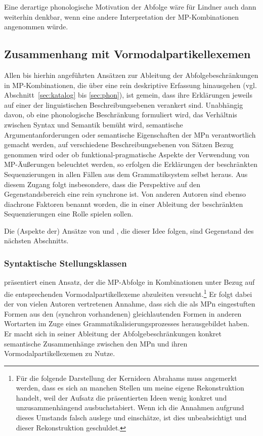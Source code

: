 Eine derartige phonologische Motivation der Abfolge wäre für Lindner auch dann weiterhin denkbar, wenn eine andere Interpretation der MP-Kombinationen angenommen würde. 	

\subsection{Zusammenhang mit Vormodalpartikellexemen}
\label{sec:vormp}
Allen bis hierhin angeführten Ansätzen zur Ableitung der Abfolgebeschränkungen in MP-Kombinationen, die über eine rein deskriptive Erfassung hinausgehen (vgl. Abschnitt~\ref{sec:katalog} bis \ref{sec:phon}), ist gemein, dass ihre Erklärungen jeweils auf einer der linguistischen Beschreibungsebenen verankert sind. Unabhängig davon, ob eine phonologische Beschränkung formuliert wird, das Verhältnis zwischen Syntax und Semantik bemüht wird, semantische Argumentanforderungen oder semantische Eigenschaften der MPn verantwortlich gemacht werden, auf verschie\-dene Beschreibungsebenen von Sätzen Bezug genommen wird oder ob funktional-pragmatische Aspekte der Verwendung von MP-Äußerungen beleuchtet werden, so erfolgen die Erklärungen der beschränkten Sequenzierungen in allen Fällen aus dem Grammatiksystem selbst heraus. Aus diesem Zugang folgt insbesondere, dass die Perspektive auf den Gegenstandsbereich eine rein synchrone  ist. Von anderen Autoren sind ebenso diachrone  Faktoren benannt worden, die in einer Ableitung der beschränkten Sequenzierungen eine Rolle spielen sollen.

Die (Aspekte der) Ansätze von \citet{Vismans1994} und \citet{Abraham1995}, die dieser Idee folgen, sind Gegenstand des nächsten Abschnitts.

\subsubsection{Syntaktische Stellungsklassen}
\citet{Abraham1995} präsentiert einen Ansatz, der die MP-Abfolge in Kombinatio\-nen unter Bezug auf die entsprechenden Vormodalpartikellexeme  abzuleiten versucht.\footnote{Für die folgende Darstellung der Kernideen Abrahams muss angemerkt werden, dass es sich an manchen Stellen um meine eigene Rekonstruktion handelt, weil der Aufsatz die präsentierten Ideen wenig konkret und unzusammenhängend ausbuchstabiert. Wenn ich die Annahmen aufgrund dieses Umstands falsch auslege und einschätze, ist dies unbeabsichtigt und dieser Rekonstruktion geschuldet.} Er folgt dabei der von vielen Autoren vertretenen Annahme, dass sich die als MPn eingestuften Formen aus den (synchron vorhandenen) gleichlautenden Formen in anderen Wortarten im Zuge eines Grammatikalisierungsprozesses  herausgebildet haben. Er macht sich in seiner Ableitung der Abfolgebeschränkungen konkret semantische Zusammenhänge zwischen den MPn und ihren Vormodalpartikellexemen zu Nutze. 

